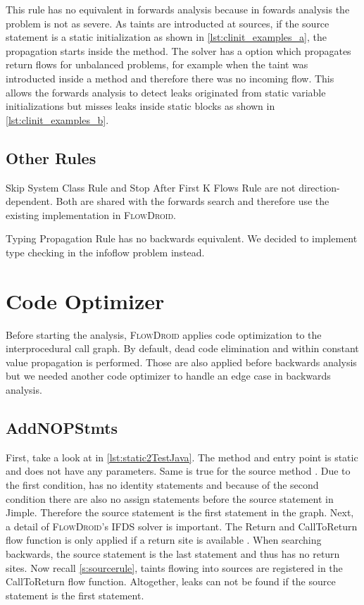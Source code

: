 \documentclass[../draft.tex]{subfiles}
\begin{document}
    This rule has no equivalent in forwards analysis because in fowards analysis the problem is not as severe. As taints are introducted at sources, if the source statement is a static initialization as shown in \autoref{lst:clinit_examples_a}, the propagation starts inside the  method. The solver has a  option which propagates return flows for unbalanced problems, for example when the taint was introducted inside a method and therefore there was no incoming flow. This allows the forwards analysis to detect leaks originated from static variable initializations but misses leaks inside static blocks as shown in \autoref{lst:clinit_examples_b}.

    \subsection{Other Rules}
    Skip System Class Rule and Stop After First K Flows Rule are not direction-dependent. Both are shared with the forwards search and therefore use the existing implementation in \textsc{FlowDroid}.
    
    Typing Propagation Rule has no backwards equivalent. We decided to implement type checking in the infoflow problem instead.



    \section{Code Optimizer}
    Before starting the analysis, \textsc{FlowDroid} applies code optimization to the interprocedural call graph. By default, dead code elimination and within constant value propagation is performed. Those are also applied before backwards analysis but we needed another code optimizer to handle an edge case in backwards analysis.

    \subsection{AddNOPStmts}
    First, take a look at  in \autoref{lst:static2TestJava}. The method and entry point  is static and does not have any parameters. Same is true for the source method . Due to the first condition,  has no identity statements and because of the second  condition there are also no assign statements before the source statement in Jimple. Therefore the source statement is the first statement in the graph. 
    Next, a detail of \textsc{FlowDroid}'s IFDS solver is important. The Return and CallToReturn flow function is only applied if a return site is available \cite{Arzt2017PhD}.
    When searching backwards, the source statement is the last statement and thus has no return sites. Now recall \autoref{s:sourcerule}, taints flowing into sources are registered in the CallToReturn flow function. Altogether, leaks can not be found if the source statement is the first statement.
\end{document}
